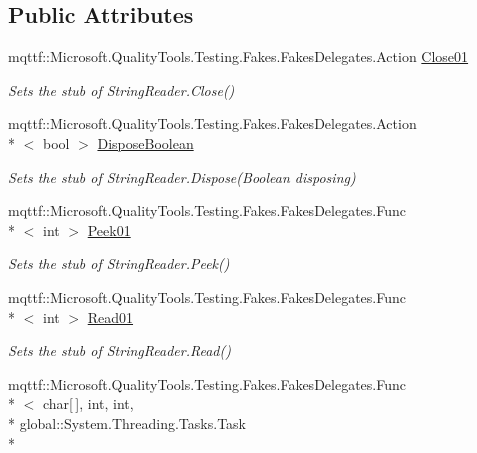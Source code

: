 \subsection*{Public Attributes}
\begin{DoxyCompactItemize}
\item 
mqttf\-::\-Microsoft.\-Quality\-Tools.\-Testing.\-Fakes.\-Fakes\-Delegates.\-Action \hyperlink{class_system_1_1_i_o_1_1_fakes_1_1_stub_string_reader_afb91293e56034d1bbf36733027eb42e8}{Close01}
\begin{DoxyCompactList}\small\item\em Sets the stub of String\-Reader.\-Close()\end{DoxyCompactList}\item 
mqttf\-::\-Microsoft.\-Quality\-Tools.\-Testing.\-Fakes.\-Fakes\-Delegates.\-Action\\*
$<$ bool $>$ \hyperlink{class_system_1_1_i_o_1_1_fakes_1_1_stub_string_reader_a438ccb10bec0857f017c17a62b2c0c52}{Dispose\-Boolean}
\begin{DoxyCompactList}\small\item\em Sets the stub of String\-Reader.\-Dispose(\-Boolean disposing)\end{DoxyCompactList}\item 
mqttf\-::\-Microsoft.\-Quality\-Tools.\-Testing.\-Fakes.\-Fakes\-Delegates.\-Func\\*
$<$ int $>$ \hyperlink{class_system_1_1_i_o_1_1_fakes_1_1_stub_string_reader_a189f946270fff9c9e67d8f46c3559086}{Peek01}
\begin{DoxyCompactList}\small\item\em Sets the stub of String\-Reader.\-Peek()\end{DoxyCompactList}\item 
mqttf\-::\-Microsoft.\-Quality\-Tools.\-Testing.\-Fakes.\-Fakes\-Delegates.\-Func\\*
$<$ int $>$ \hyperlink{class_system_1_1_i_o_1_1_fakes_1_1_stub_string_reader_a77e753f27809c54f6e6ae72092c0f643}{Read01}
\begin{DoxyCompactList}\small\item\em Sets the stub of String\-Reader.\-Read()\end{DoxyCompactList}\item 
mqttf\-::\-Microsoft.\-Quality\-Tools.\-Testing.\-Fakes.\-Fakes\-Delegates.\-Func\\*
$<$ char\mbox{[}$\,$\mbox{]}, int, int, \\*
global\-::\-System.\-Threading.\-Tasks.\-Task\\*

\end{DoxyCompactItemize}
